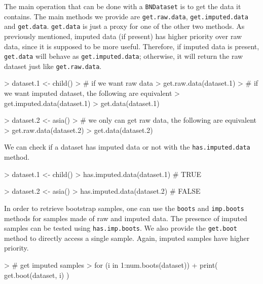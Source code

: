 \documentclass{article}
\newcommand{\Robject}[1]{{\texttt{#1}}}
\newcommand{\Rmethod}[1]{{\texttt{#1}}}
\begin{document}
The main operation that can be done with a \Robject{BNDataset} is to get the data it contains.
The main methods we provide are \Rmethod{get.raw.data}, \Rmethod{get.imputed.data} and \Rmethod{get.data}. \Rmethod{get.data} is just a proxy
for one of the other two methods.
As previously mentioned, imputed data (if present) has higher priority over raw data, since it is supposed to be more useful.
Therefore, if imputed data is present, \Rmethod{get.data} will behave as \Rmethod{get.imputed.data}; otherwise,
it will return the raw dataset just like \Rmethod{get.raw.data}.

\begin{Schunk}
\begin{Sinput}
> dataset.1 <- child()
> # if we want raw data
> get.raw.data(dataset.1)
> # if we want imputed dataset, the following are equivalent
> get.imputed.data(dataset.1)
> get.data(dataset.1)
\end{Sinput}
\end{Schunk}

\begin{Schunk}
\begin{Sinput}
> dataset.2 <- asia()
> # we only can get raw data, the following are equivalent
> get.raw.data(dataset.2)
> get.data(dataset.2)
\end{Sinput}
\end{Schunk}

We can check if a dataset has imputed data or not with the \Rmethod{has.imputed.data} method.
\begin{Schunk}
\begin{Sinput}
> dataset.1 <- child()
> has.imputed.data(dataset.1) # TRUE
\end{Sinput}
\end{Schunk}

\begin{Schunk}
\begin{Sinput}
> dataset.2 <- asia()
> has.imputed.data(dataset.2) # FALSE
\end{Sinput}
\end{Schunk}

In order to retrieve bootstrap samples, one can use the \Rmethod{boots} and \Rmethod{imp.boots} methods for samples
made of raw and imputed data. The presence of imputed samples can be tested using \Rmethod{has.imp.boots}.
We also provide the \Rmethod{get.boot} method to directly access a single sample. Again, imputed samples have higher priority.
\begin{Schunk}
\begin{Sinput}
> # get imputed samples
> for (i in 1:num.boots(dataset))
+   print( get.boot(dataset, i) )
\end{Sinput}
\end{Schunk}
\end{document}

